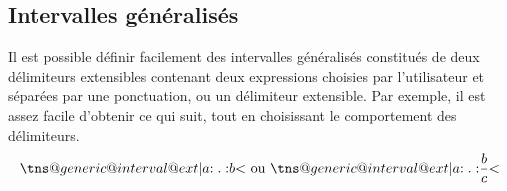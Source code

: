 \documentclass[12pt, a4paper]{article}
\begin{document}


\subsection{Intervalles généralisés}

\makeatletter
\newcommand\strangeset[2]{%
    \tns@generic@interval@ext{|}  %
                             {#1} %
                             {:.:} %
                             {#2} %
                             {<}  %
}
\makeatother

Il est possible définir facilement des intervalles généralisés constitués de deux délimiteurs extensibles contenant deux expressions choisies par l'utilisateur et séparées par une ponctuation, ou un délimiteur extensible.
Par exemple, il est assez facile d'obtenir ce qui suit, tout en choisissant le comportement des délimiteurs.
\[ \strangeset{a}{b} \text{ ou } \strangeset{a}{\dfrac{b}{c}} \]



%
%
%
%
%
%
%
%
%
%
%
%
%
%
%
%
%
%
%
%
%
%
%
%
\end{document}
